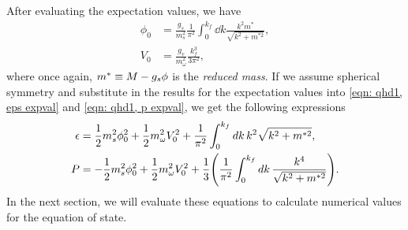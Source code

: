 After evaluating the expectation values, we have
\begin{align}
    \phi_0 &= \frac{g_s}{m_s^2} \frac{1}{\pi^2}\int_0^{k_f} \dd{k} \frac{k^2 m^*}{\sqrt{k^2 + m^{*2}}}, \label{eqn: rmf,phi0} \\
    V_0 &= \frac{g_v}{m_\omega^2} \frac{k_f^3}{3\pi^2}, \label{eqn: rmf,V0}
\end{align}
where once again, $m^* \equiv M - g_s \phi$ is the \emph{reduced mass}. If we assume spherical symmetry and substitute in the results for the expectation values into \eqref{eqn: qhd1, eps expval} and \eqref{eqn: qhd1, p expval}, we get the following expressions
\begin{align}
    \epsilon & = \frac{1}{2} m_s^2 \phi_0^2 + \frac{1}{2} m_\omega^2 V_0^2 + \frac{1}{\pi^2} \int_0^{k_f} \dd{k} k^2 \sqrt{k^2 + m^{*2}}, \label{eqn: rmf,eps}\\
    P & = -\frac{1}{2} m_s^2 \phi_0^2 + \frac{1}{2} m_\omega^2 V_0^2 + \frac{1}{3} \pqty{\frac{1}{\pi^2} \int_0^{k_f} \dd{k}\frac{k^4}{\sqrt{k^2 + m^{*2}}}}. \label{eqn: rmf,p}
\end{align}
In the next section, we will evaluate these equations to calculate numerical values for the equation of state.




